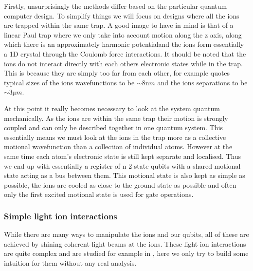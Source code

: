 Firstly, unsurprisingly the methods differ based on the particular quantum computer design.
To simplify things we will focus on designs where all the ions are trapped within the same trap.
A good image to have in mind is that of a linear Paul trap where we only take into account motion along the z axis, along which there is an approximately harmonic potential\footnotemark and the ions form essentially a 1D crystal through the Coulomb force interactions.
It should be noted that the ions do not interact directly with each others electronic states while in the trap.
This is because they are simply too far from each other, for example \cite{schaferFastGatesMixedSpecies2020} quotes typical sizes of the ions wavefunctions to be $\sim 8 \si{\nano m}$ and the ions separations to be $\sim 3 \si{\micro m}$.


At this point it really becomes necessary to look at the system quantum mechanically.
As the ions are within the same trap their motion is strongly coupled and can only be described together in one quantum system.
This essentially means we must look at the ions in the trap more as a collective motional wavefunction than a collection of individual atoms.
However at the same time each atom's electronic state is still kept separate and localised.
Thus we end up with essentially a register of n 2 state qubits with a shared motional state acting as a bus between them.
This motional state is also kept as simple as possible, the ions are cooled as close to the ground state as possible and often only the first excited motional state is used for gate operations.

\subsubsection{Simple light ion interactions}\label{sec:TIQC_lightint}
While there are many ways to manipulate the ions and our qubits, all of these are achieved by shining coherent light beams at the ions.
These light ion interactions are quite complex and are studied for example in \cite{loudonQuantumTheoryLight2000}, here we only try to build some intuition for them without any real analysis.

